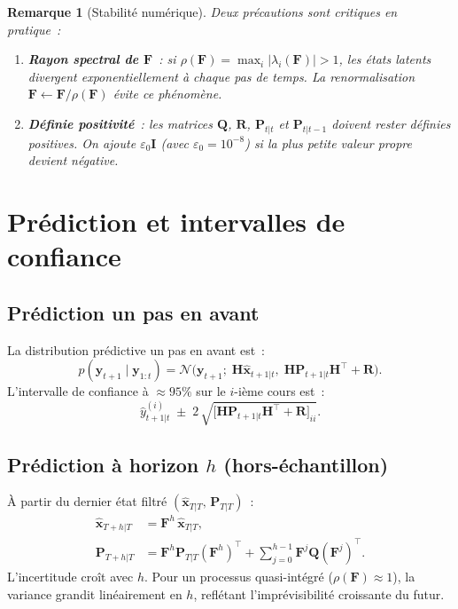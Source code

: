 \documentclass[11pt,a4paper]{article}
\newtheorem*{remark}{Remarque}
\newcommand{\bx}{\bm{x}}
\newcommand{\by}{\bm{y}}
\newcommand{\bF}{\bm{F}}
\newcommand{\bH}{\bm{H}}
\newcommand{\bQ}{\bm{Q}}
\newcommand{\bR}{\bm{R}}
\newcommand{\bP}{\bm{P}}
\newcommand{\bI}{\bm{I}}
\newcommand{\N}{\mathcal{N}}
\newcommand{\given}{\mid}
\begin{document}
\begin{remark}[Stabilité numérique]
Deux précautions sont critiques en pratique~:
\begin{enumerate}
  \item \textbf{Rayon spectral de $\bF$}~: si $\rho(\bF) = \max_i|\lambda_i(\bF)| > 1$,
    les états latents divergent exponentiellement à chaque pas de temps.
    La renormalisation $\bF \leftarrow \bF/\rho(\bF)$ évite ce phénomène.
  \item \textbf{Définie positivité}~: les matrices $\bQ$, $\bR$, $\bP_{t|t}$ et $\bP_{t|t-1}$
    doivent rester définies positives. On ajoute $\varepsilon_0\bI$
    (avec $\varepsilon_0 = 10^{-8}$) si la plus petite valeur propre devient négative.
\end{enumerate}
\end{remark}

\section{Prédiction et intervalles de confiance}

\subsection{Prédiction un pas en avant}

La distribution prédictive un pas en avant est~:
\[
  p(\by_{t+1} \given \by_{1:t})
  = \N\!\bigl(\by_{t+1};\; \bH\hat{\bx}_{t+1|t},\;
    \bH\bP_{t+1|t}\bH^\top + \bR\bigr).
\]
L'intervalle de confiance à $\approx\!95\%$ sur le $i$-ième cours est~:
\[
  \hat{y}_{t+1|t}^{(i)} \;\pm\; 2\,\sqrt{\bigl[\bH\bP_{t+1|t}\bH^\top+\bR\bigr]_{ii}}.
\]

\subsection{Prédiction à horizon $h$ (hors-échantillon)}

À partir du dernier état filtré $(\hat{\bx}_{T|T},\,\bP_{T|T})$~:
\begin{align}
  \hat{\bx}_{T+h|T} &= \bF^h\,\hat{\bx}_{T|T}, \\
  \bP_{T+h|T} &= \bF^h\bP_{T|T}(\bF^h)^\top
                 + \sum_{j=0}^{h-1}\bF^j\bQ(\bF^j)^\top.
\end{align}
L'incertitude croît avec $h$. Pour un processus quasi-intégré ($\rho(\bF)\approx 1$),
la variance grandit linéairement en $h$, reflétant l'imprévisibilité
croissante du futur.
\end{document}
